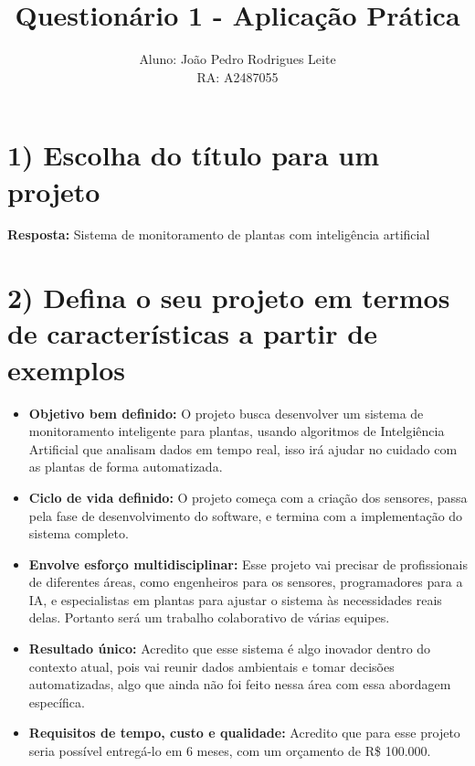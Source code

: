 \documentclass{article}
\title{Questionário 1 - Aplicação Prática}
\author{Aluno: João Pedro Rodrigues Leite \\ RA: A2487055}
\date{}
\begin{document}
	
	\maketitle
	
	\section*{1) Escolha do título para um projeto}
	\textbf{Resposta:} Sistema de monitoramento de plantas com inteligência artificial
	
	\section*{2) Defina o seu projeto em termos de características a partir de exemplos}
	\begin{itemize}
		\item \textbf{Objetivo bem definido:} O projeto busca desenvolver um sistema de monitoramento inteligente para plantas, usando algoritmos de Intelgiência Artificial que analisam dados em tempo real, isso irá ajudar no cuidado com as plantas de forma automatizada.
		
		\item \textbf{Ciclo de vida definido:} O projeto começa com a criação dos sensores, passa pela fase de desenvolvimento do software, e termina com a implementação do sistema completo.
		
		\item \textbf{Envolve esforço multidisciplinar:} Esse projeto vai precisar de profissionais de diferentes áreas, como engenheiros para os sensores, programadores para a IA, e especialistas em plantas para ajustar o sistema às necessidades reais delas. Portanto será um trabalho colaborativo de várias equipes.
		
		\item \textbf{Resultado único:} Acredito que esse sistema é algo inovador dentro do contexto atual, pois vai reunir dados ambientais e tomar decisões automatizadas, algo que ainda não foi feito nessa área com essa abordagem específica.
		
		\item \textbf{Requisitos de tempo, custo e qualidade:} Acredito que para esse projeto seria possível entregá-lo em 6 meses, com um orçamento de R\$ 100.000.
	\end{itemize}

	
\end{document}
